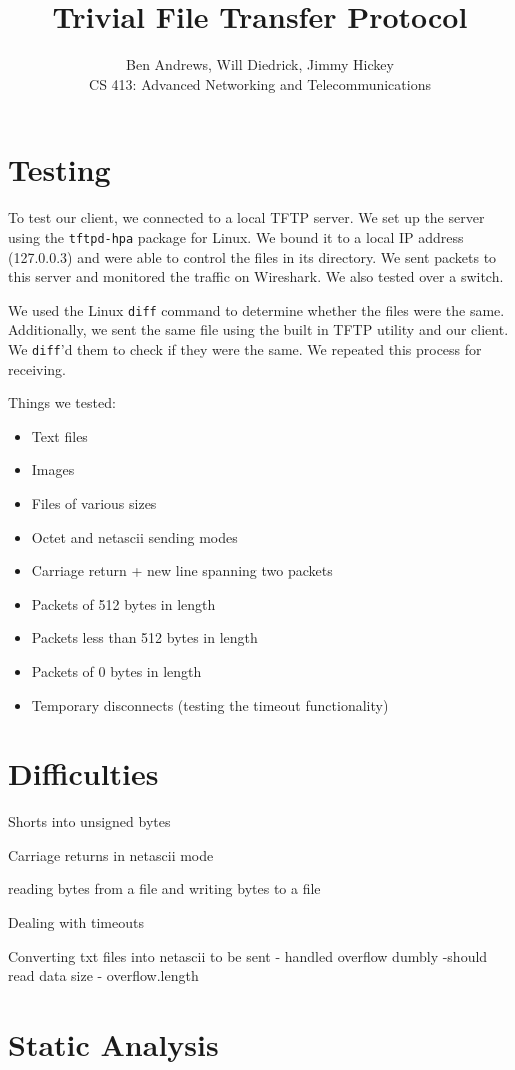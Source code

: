 \documentclass[12pt]{article}
\title{Trivial File Transfer Protocol}
\author{Ben Andrews, Will Diedrick, Jimmy Hickey\\CS 413: Advanced Networking and Telecommunications}
\begin{document}
\maketitle
\tableofcontents
\clearpage

\doublespacing

\section{Testing}

To test our client, we connected to a local TFTP server. We set up the server using the \lstinline|tftpd-hpa| package for Linux. We bound it to a local IP address (127.0.0.3) and were able to control the files in its directory. We sent packets to this server and monitored the traffic on Wireshark. We also tested over a switch.

We used the Linux \lstinline|diff| command to determine whether the files were the same. Additionally, we sent the same file using the built in TFTP utility and our client. We \lstinline|diff|'d them to check if they were the same. We repeated this process for receiving. 

Things we tested:
\singlespacing
\begin{itemize}
\item Text files
\item Images
\item Files of various sizes
\item Octet and netascii sending modes
\item Carriage return + new line spanning two packets
\item Packets of 512 bytes in length
\item Packets less than 512 bytes in length
\item Packets of 0 bytes in length
\item Temporary disconnects (testing the timeout functionality)
\end{itemize}
\doublespacing

\section{Difficulties}
Shorts into unsigned bytes

Carriage returns in netascii mode

reading bytes from a file and writing bytes to a file

Dealing with timeouts

Converting txt files into netascii to be sent
	- handled overflow dumbly
	-should read data size - overflow.length


\section{Static Analysis}
\end{document}
